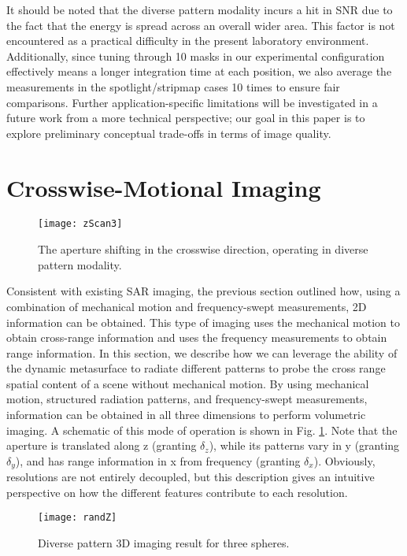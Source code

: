 \documentclass[journal]{IEEEtran}
\begin{document}
It should be noted that the diverse pattern modality incurs a hit in SNR due to the fact that the energy is spread across an overall wider area. This factor is not encountered as a practical difficulty in the present laboratory environment. Additionally, since tuning through 10 masks in our experimental configuration effectively means a longer integration time at each position, we also average the measurements in the spotlight/stripmap cases 10 times to ensure fair comparisons. Further application-specific limitations will be investigated in a future work from a more technical perspective; our goal in this paper is to explore preliminary conceptual trade-offs in terms of image quality.


\section{Crosswise-Motional Imaging}
\label{sec:sec5}

\begin{figure} 
	\centering
	\texttt{[image: zScan3]}
	\caption{\label{fig:f11}The aperture shifting in the crosswise direction, operating in diverse pattern modality.}
\end{figure}

Consistent with existing SAR imaging, the previous section outlined how, using a combination of mechanical motion and frequency-swept measurements, 2D information can be obtained.  This type of imaging uses the mechanical motion to obtain cross-range information and uses the frequency measurements to obtain range information.  In this section, we describe how we can leverage the ability of the dynamic metasurface to radiate different patterns to probe the cross range spatial content of a scene without mechanical motion.  By using mechanical motion, structured radiation patterns, and frequency-swept measurements, information can be obtained in all three dimensions to perform volumetric imaging. A schematic of this mode of operation is shown in Fig. \ref{fig:f11}. Note that the aperture is translated along z (granting $\delta_z$), while its patterns vary in y (granting $\delta_y$), and has range information in x from frequency (granting $\delta_x$). Obviously, resolutions are not entirely decoupled, but this description gives an intuitive perspective on how the different features contribute to each resolution. 

\begin{figure} 
	\centering
	\texttt{[image: randZ]}
	\caption{\label{fig:f12}Diverse pattern 3D imaging result for three spheres.}
\end{figure}
\end{document}
